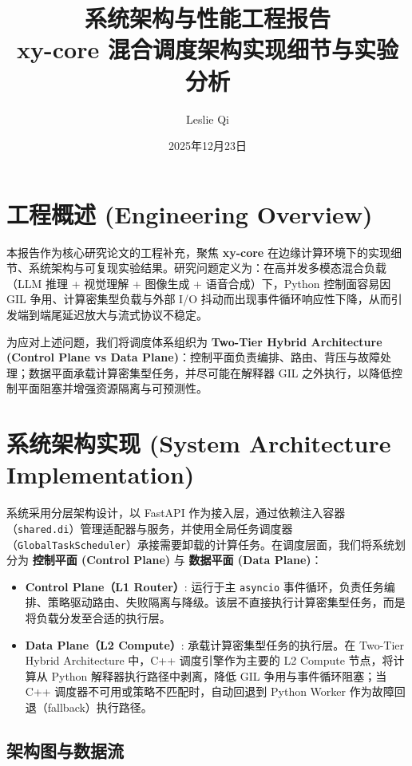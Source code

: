 \documentclass[a4paper,12pt]{article}
\title{\textbf{系统架构与性能工程报告}\\ \large xy-core 混合调度架构实现细节与实验分析}
\author{Leslie Qi}
\date{2025年12月23日}
\begin{document}
\sloppy
\setlength{\emergencystretch}{2em}

\maketitle

\tableofcontents
\clearpage

\section{工程概述 (Engineering Overview)}

本报告作为核心研究论文的工程补充，聚焦 \textbf{xy-core} 在边缘计算环境下的实现细节、系统架构与可复现实验结果。研究问题定义为：在高并发多模态混合负载（LLM 推理 + 视觉理解 + 图像生成 + 语音合成）下，Python 控制面容易因 GIL 争用、计算密集型负载与外部 I/O 抖动而出现事件循环响应性下降，从而引发端到端尾延迟放大与流式协议不稳定。

为应对上述问题，我们将调度体系组织为 \textbf{Two-Tier Hybrid Architecture (Control Plane vs Data Plane)}：控制平面负责编排、路由、背压与故障处理；数据平面承载计算密集型任务，并尽可能在解释器 GIL 之外执行，以降低控制平面阻塞并增强资源隔离与可预测性。

\section{系统架构实现 (System Architecture Implementation)}

系统采用分层架构设计，以 FastAPI 作为接入层，通过依赖注入容器（\texttt{shared.di}）管理适配器与服务，并使用全局任务调度器（\texttt{GlobalTaskScheduler}）承接需要卸载的计算任务。在调度层面，我们将系统划分为 \textbf{控制平面 (Control Plane)} 与 \textbf{数据平面 (Data Plane)}：

\begin{itemize}
    \item \textbf{Control Plane（L1 Router）}: 运行于主 \texttt{asyncio} 事件循环，负责任务编排、策略驱动路由、失败隔离与降级。该层不直接执行计算密集型任务，而是将负载分发至合适的执行层。
    \item \textbf{Data Plane（L2 Compute）}: 承载计算密集型任务的执行层。在 Two-Tier Hybrid Architecture 中，C++ 调度引擎作为主要的 L2 Compute 节点，将计算从 Python 解释器执行路径中剥离，降低 GIL 争用与事件循环阻塞；当 C++ 调度器不可用或策略不匹配时，自动回退到 Python Worker 作为故障回退（fallback）执行路径。
\end{itemize}

\subsection{架构图与数据流}
\end{document}
